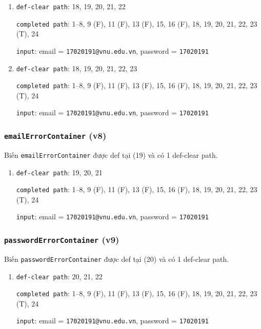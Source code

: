 \documentclass{article}
\begin{document}
\begin{enumerate}
    \item \texttt{def-clear path}: 18, 19, 20, 21, 22
          \par \texttt{completed path}: 1--8, 9 (F), 11 (F), 13 (F), 15, 16 (F), 18, 19, 20, 21, 22, 23 (T), 24
          \par \texttt{input}: email = \texttt{17020191@vnu.edu.vn}, password = \texttt{17020191}

    \item \texttt{def-clear path}: 18, 19, 20, 21, 22, 23
          \par \texttt{completed path}: 1--8, 9 (F), 11 (F), 13 (F), 15, 16 (F), 18, 19, 20, 21, 22, 23 (T), 24
          \par \texttt{input}: email = \texttt{17020191@vnu.edu.vn}, password = \texttt{17020191}
\end{enumerate}

\subsubsection*{\texttt{emailErrorContainer} (v8)}

\par Biến \texttt{emailErrorContainer} được def tại (19) và có 1 def-clear path.

\begin{enumerate}
    \item \texttt{def-clear path}: 19, 20, 21
          \par \texttt{completed path}: 1--8, 9 (F), 11 (F), 13 (F), 15, 16 (F), 18, 19, 20, 21, 22, 23 (T), 24
          \par \texttt{input}: email = \texttt{17020191@vnu.edu.vn}, password = \texttt{17020191}
\end{enumerate}

\subsubsection*{\texttt{passwordErrorContainer} (v9)}

\par Biến \texttt{passwordErrorContainer} được def tại (20) và có 1 def-clear path.

\begin{enumerate}
    \item \texttt{def-clear path}: 20, 21, 22
          \par \texttt{completed path}: 1--8, 9 (F), 11 (F), 13 (F), 15, 16 (F), 18, 19, 20, 21, 22, 23 (T), 24
          \par \texttt{input}: email = \texttt{17020191@vnu.edu.vn}, password = \texttt{17020191}
\end{enumerate}
\end{document}
